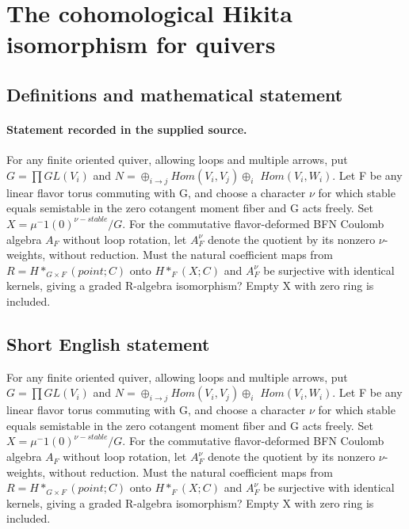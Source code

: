 \documentclass[11pt]{article}
\begin{document}
\section*{The cohomological Hikita isomorphism for quivers}\label{statement}
\subsection{Definitions and mathematical statement}
\paragraph{Statement recorded in the supplied source.}
For any finite oriented quiver, allowing loops and multiple arrows, put $G=\prod GL(V_i)$ and $N=\oplus _{i\to j}Hom(V_i,V_j)\oplus _i$ $Hom(V_i,W_i)$. Let F be any linear flavor torus commuting with G, and choose a character $\nu $ for which stable equals semistable in the zero cotangent moment fiber and G acts freely. Set $X=\mu ^-1(0)^{\nu -stable}/G$. For the commutative flavor-deformed BFN Coulomb algebra $A_F$ without loop rotation, let $A_F^\nu $ denote the quotient by its nonzero $\nu$-weights, without reduction. Must the natural coefficient maps from $R=H*_{G×F}(point;C)$ onto $H*_F(X;C)$ and $A_F^\nu $ be surjective with identical kernels, giving a graded R-algebra isomorphism? Empty X with zero ring is included.
\subsection{Short English statement}
For any finite oriented quiver, allowing loops and multiple arrows, put $G=\prod GL(V_i)$ and $N=\oplus _{i\to j}Hom(V_i,V_j)\oplus _i$ $Hom(V_i,W_i)$. Let F be any linear flavor torus commuting with G, and choose a character $\nu $ for which stable equals semistable in the zero cotangent moment fiber and G acts freely. Set $X=\mu ^-1(0)^{\nu -stable}/G$. For the commutative flavor-deformed BFN Coulomb algebra $A_F$ without loop rotation, let $A_F^\nu $ denote the quotient by its nonzero $\nu$-weights, without reduction. Must the natural coefficient maps from $R=H*_{G×F}(point;C)$ onto $H*_F(X;C)$ and $A_F^\nu $ be surjective with identical kernels, giving a graded R-algebra isomorphism? Empty X with zero ring is included.
\end{document}
